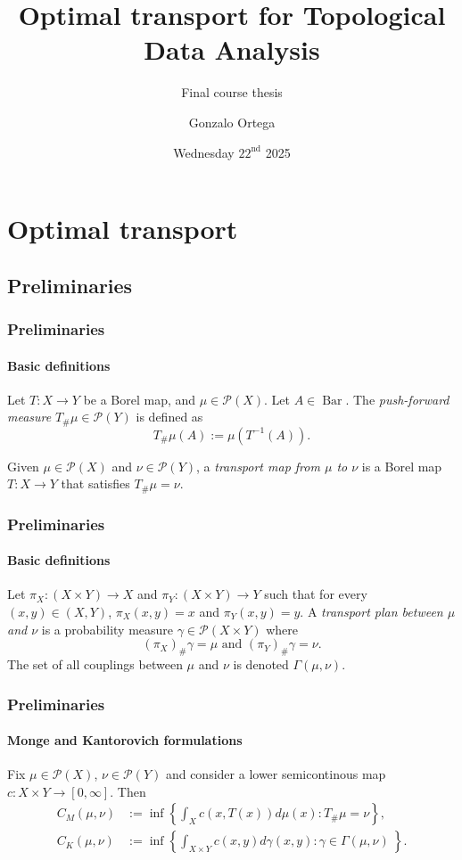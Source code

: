 \documentclass[aspectratio=169]{beamer}
\title{Optimal transport for Topological Data Analysis}
\subtitle{Final course thesis}
\author{Gonzalo Ortega}
\date{Wednesday $22^{\text{nd}}$ 2025}
\newcommand{\brc}{\operatorname{Bar}}
\newcommand{\p}{\mathcal P}
\newcommand{\B}{\brc}
\newcommand{\T}{T_\#}
\begin{document}
\frame{\titlepage}


\section{Optimal transport}
\subsection{Preliminaries}
  \begin{frame}
    \frametitle{Preliminaries}
    \framesubtitle{Basic definitions}
    \begin{definition}
      Let $ T: X \to Y $ be a Borel map, and $ \mu \in \p(X)$. Let $ A \in \B $. The {\it push-forward measure} $ \T\mu \in \p(Y) $ is defined as
      $$
          \T\mu(A) := \mu (T^{-1}(A)).
      $$
    \end{definition}

    \begin{definition}
        Given $ \mu \in \p(X) $ and $ \nu \in \p(Y) $, a {\it transport map from $\mu$ to $\nu$} is a Borel map $ T: X \to Y $ that satisfies $ \T\mu = \nu$.
    \end{definition}
  \end{frame}

  \begin{frame}
    \frametitle{Preliminaries}
    \framesubtitle{Basic definitions}
    \begin{definition}
      Let $\pi_X : (X \times Y) \to X $ and $\pi_Y : (X \times Y) \to Y$ such that for every $(x, y) \in (X, Y) $, $\pi_X(x, y) = x$ and $ \pi_Y(x, y) = y $. A {\it transport plan between $\mu$ and $\nu$} is a probability measure $ \gamma \in \p(X \times Y) $ where
      $$
          (\pi_X)_\# \gamma = \mu \text{ and } (\pi_Y)_\# \gamma = \nu.
      $$
      The set of all couplings between $ \mu $ and $\nu$ is denoted $\Gamma(\mu, \nu)$.
    \end{definition}
  \end{frame}

  \begin{frame}
    \frametitle{Preliminaries}
    \framesubtitle{Monge and Kantorovich formulations}
    \begin{definition}
      Fix $ \mu \in \p(X)$, $\nu \in \p(Y)$ and consider a lower semicontinous map $ c: X \times Y \to [0, \infty] $. Then
      \begin{align*}
        C_M(\mu, \nu) &:= \inf \left\{\int_X c(x, T(x)) d\mu(x) : \T\mu = \nu \right\}, \\
        C_K(\mu, \nu) &:= \inf \left\{\int_{X \times Y} c(x, y) d\gamma(x,y) : \gamma \in \Gamma(\mu, \nu) \ \right\}.
      \end{align*}
    \end{definition}
  \end{frame}
\end{document}
